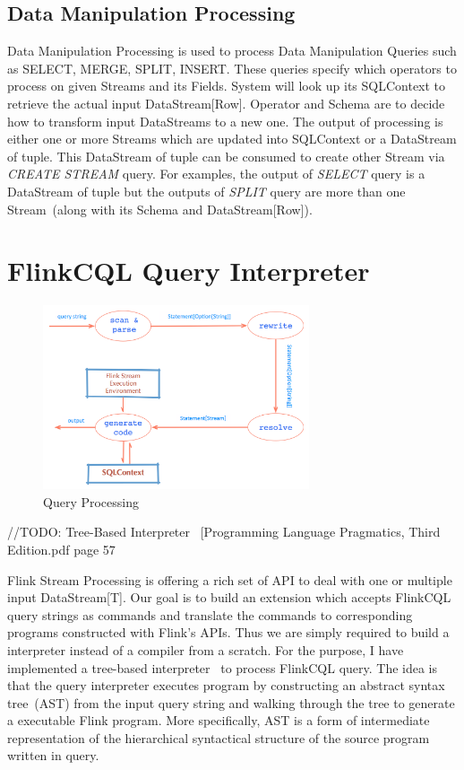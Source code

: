 \subsection{Data Manipulation Processing}
Data Manipulation Processing is used to process Data Manipulation Queries such as SELECT, MERGE, SPLIT, INSERT. These queries specify which operators to process on given Streams and its Fields. System will look up its SQLContext to retrieve the actual input DataStream[Row]. Operator and Schema are to decide how to transform input DataStreams to a new one. The output of processing is either one or more Streams which are updated into SQLContext or a DataStream of tuple. This DataStream of tuple can be consumed to create other Stream via \textit{CREATE STREAM} query. For examples, the output of \textit{SELECT} query is a DataStream of tuple but the outputs of \textit{SPLIT} query are more than one Stream~(along with its Schema and DataStream[Row]).

\section{FlinkCQL Query Interpreter}
\begin{figure}[h!] 
\centering    
\includegraphics[width=0.7\textwidth]{QueryProcessing}
\caption{Query Processing}
\label{fig:QueryProcessing}
\end{figure}


//TODO: Tree-Based Interpreter~\citep{Parr:2009}
[Programming Language Pragmatics, Third Edition.pdf page 57


Flink Stream Processing is offering a rich set of API to deal with one or  multiple input DataStream[T]. Our goal is to build an extension which accepts FlinkCQL query strings as commands and translate the commands to  corresponding programs constructed with Flink's APIs. Thus we are simply required to build a interpreter instead of a compiler from a scratch. For the purpose, I have implemented a tree-based interpreter~\citep{Parr:2009} to process FlinkCQL query. The idea is that the query interpreter executes program by constructing an abstract syntax tree~(AST) from the input query string and walking through the tree to generate a executable Flink program. More specifically, AST is a form of intermediate representation of the hierarchical syntactical structure of the source program written in query.  
	

